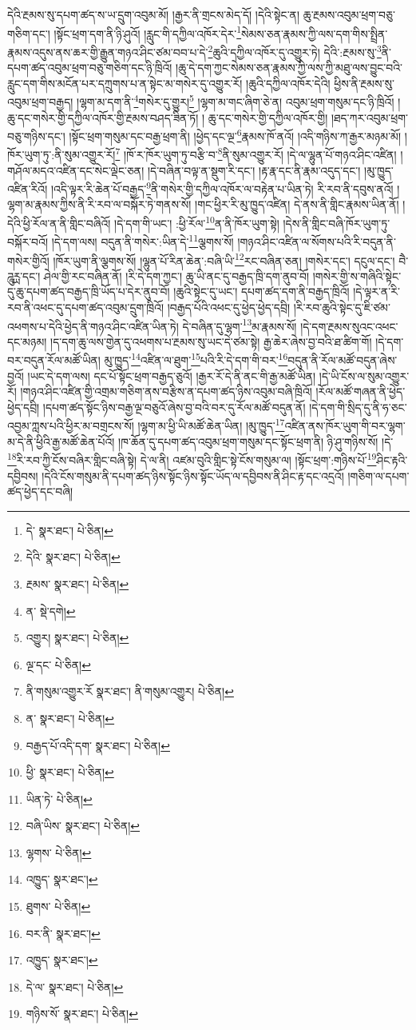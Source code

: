 དེའི་རྔམས་སུ་དཔག་ཚད་ས་ཡ་དྲུག་འབུམ་མོ། །རྒྱར་ནི་གྲངས་མེད་དོ། །དེའི་སྟེང་ན། ཆུ་རྔམས་འབུམ་ཕྲག་བཅུ་གཅིག་དང་། །སྟོང་ཕྲག་དག་ནི་ཉི་ཤུའོ། །རླུང་གི་དཀྱིལ་འཁོར་དེར་\footnote{དེ་  སྣར་ཐང་།  པེ་ཅིན། }སེམས་ཅན་རྣམས་ཀྱི་ལས་དག་གིས་སྤྲིན་རྣམས་འདུས་ནས་ཆར་གྱི་རྒྱུན་གཉའ་ཤིང་ཙམ་བབ་པ་དེ་\footnote{དེའི་  སྣར་ཐང་།  པེ་ཅིན། }ཆུའི་དཀྱིལ་འཁོར་དུ་འགྱུར་ཏེ། དེའི་:རྔམས་སུ་\footnote{རྔམས་  སྣར་ཐང་།  པེ་ཅིན། }ནི་དཔག་ཚད་འབུམ་ཕྲག་བཅུ་གཅིག་དང་ཉི་ཁྲིའོ། །ཆུ་དེ་དག་ཀྱང་སེམས་ཅན་རྣམས་ཀྱི་ལས་ཀྱི་མཐུ་ལས་བྱུང་བའི་རླུང་དག་གིས་མངོན་པར་དཀྲུགས་པ་ན་སྟེང་མ་གསེར་དུ་འགྱུར་རོ། །ཆུའི་དཀྱིལ་འཁོར་དེའི། ཕྱིས་ནི་རྔམས་སུ་འབུམ་ཕྲག་བརྒྱད། །ལྷག་མ་དག་ནི་\footnote{ན་  སྡེ་དགེ། }གསེར་དུ་གྱུར།\footnote{འགྱུར།  སྣར་ཐང་།  པེ་ཅིན། } །ལྷག་མ་གང་ཞིག་ཅེ་ན། འབུམ་ཕྲག་གསུམ་དང་ཉི་ཁྲིའོ། །ཆུ་དང་གསེར་གྱི་དཀྱིལ་འཁོར་གྱི་རྔམས་བཤད་ཟིན་ཏོ། །
ཆུ་དང་གསེར་གྱི་དཀྱིལ་འཁོར་གྱི། །ཐད་ཀར་འབུམ་ཕྲག་བཅུ་གཉིས་དང་། །སྟོང་ཕྲག་གསུམ་དང་བརྒྱ་ཕྲག་ནི། །ཕྱེད་དང་ལྔ་\footnote{ལྔ་དང་  པེ་ཅིན། }རྣམས་ཁོ་ནའོ། །འདི་གཉིས་ཀ་རྒྱར་མཉམ་མོ། །ཁོར་ཡུག་ཏུ་:ནི་སུམ་འགྱུར་རོ།\footnote{ནི་གསུམ་འགྱུར་རོ  སྣར་ཐང་། ནི་གསུམ་འགྱུར།  པེ་ཅིན། } །ཁོ་ར་ཁོར་ཡུག་ཏུ་བརྩི་བ་\footnote{ན་  སྣར་ཐང་།  པེ་ཅིན། }ནི་སུམ་འགྱུར་རོ། །དེ་ལ་ལྷུན་པོ་གཉའ་ཤིང་འཛིན། །གཤོལ་མདའ་འཛིན་དང་སེང་ལྡེང་ཅན། །དེ་བཞིན་བལྟ་ན་སྡུག་རི་དང་། །རྟ་རྣ་དང་ནི་རྣམ་འདུད་དང་། །མུ་ཁྱུད་འཛིན་རིའོ། །འདི་ལྟར་རི་ཆེན་པོ་བརྒྱད་\footnote{བརྒྱད་པོ་འདི་དག་  སྣར་ཐང་།  པེ་ཅིན། }ནི་གསེར་གྱི་དཀྱིལ་འཁོར་ལ་བརྟེན་པ་ཡིན་ཏེ། རི་རབ་ནི་དབུས་ནའོ། །ལྷག་མ་རྣམས་ཀྱིས་ནི་རི་རབ་ལ་བསྐོར་ཏེ་གནས་སོ། །གང་ཕྱིར་རི་མུ་ཁྱུད་འཛིན། དེ་ནས་ནི་གླིང་རྣམས་ཡིན་ནོ། །དེའི་ཕྱི་རོལ་ན་ནི་གླིང་བཞིའོ། །དེ་དག་གི་ཡང་། :ཕྱི་རོལ་\footnote{ཕྱི་  སྣར་ཐང་།  པེ་ཅིན། }ན་ནི་ཁོར་ཡུག་སྟེ། །དེས་ནི་གླིང་བཞི་ཁོར་ཡུག་ཏུ་བསྐོར་བའོ། །དེ་དག་ལས། བདུན་ནི་གསེར་:ཡིན་དེ་\footnote{ཡིན་ཏེ་  པེ་ཅིན། }ལྕགས་སོ། །གཉའ་ཤིང་འཛིན་ལ་སོགས་པའི་རི་བདུན་ནི་གསེར་གྱིའོ། །ཁོར་ཡུག་ནི་ལྕགས་སོ། །ལྷུན་པོ་རིན་ཆེན་:བཞི་ཡི་\footnote{བཞི་ཡིས་  སྣར་ཐང་།  པེ་ཅིན། }རང་བཞིན་ཅན། །གསེར་དང་། དངུལ་དང་། བཻ་ཌཱུཪྻ་དང་། ཤེལ་གྱི་རང་བཞིན་ནོ། །རི་དེ་དག་ཀྱང་། ཆུ་ཡི་ནང་དུ་བརྒྱད་ཁྲི་དག་ནུབ་བོ། །གསེར་གྱི་ས་གཞིའི་སྟེང་དུ་ཆུ་དཔག་ཚད་བརྒྱད་ཁྲི་ཡོད་པ་དེར་ནུབ་བོ། །ཆུའི་སྟེང་དུ་ཡང་། དཔག་ཚད་དག་ནི་བརྒྱད་ཁྲིའོ། །དེ་ལྟར་ན་རི་རབ་ནི་འཕང་དུ་དཔག་ཚད་འབུམ་དྲུག་ཁྲིའོ། །བརྒྱད་པོའི་འཕང་དུ་ཕྱེད་ཕྱེད་དབྲི། །རི་རབ་ཆུའི་སྟེང་དུ་ཇི་ཙམ་འཕགས་པ་དེའི་ཕྱེད་ནི་གཉའ་ཤིང་འཛིན་ཡིན་ཏེ། དེ་བཞིན་དུ་ལྷག་\footnote{ལྷགས་  པེ་ཅིན། }མ་རྣམས་སོ། །དེ་དག་རྔམས་སུའང་འཕང་དང་མཉམ། །ད་དག་ཆུ་ལས་གྱེན་དུ་འཕགས་པ་རྔམས་སུ་ཡང་དེ་ཙམ་སྟེ། རྒྱ་ཆེར་ཞེས་བྱ་བའི་ཐ་ཚིག་གོ། །དེ་དག་བར་བདུན་རོལ་མཚོ་ཡིན། མུ་ཁྱུད་\footnote{འཁྱུད་  སྣར་ཐང་། }འཛིན་ལ་ཐུག་\footnote{ཐུགས་  པེ་ཅིན། }པའི་རི་དེ་དག་གི་བར་\footnote{བར་ནི་  སྣར་ཐང་། }བདུན་ནི་རོལ་མཚོ་བདུན་ཞེས་བྱའོ། །ཡང་དེ་དག་ལས། དང་པོ་སྟོང་ཕྲག་བརྒྱད་ཅུའོ། །རྒྱར་རོ་དེ་ནི་ནང་གི་རྒྱ་མཚོ་ཡིན། །དེ་ཡི་ངོས་ལ་སུམ་འགྱུར་རོ། །གཉའ་ཤིང་འཛིན་གྱི་འགྲམ་གཅིག་ནས་བརྩིས་ན་དཔག་ཚད་ཉིས་འབུམ་བཞི་ཁྲིའོ། །རོལ་མཚོ་གཞན་ནི་ཕྱེད་ཕྱེད་དབྲི། །དཔག་ཚད་སྟོང་ཉིས་བརྒྱ་ལྔ་བཅུའོ་ཞེས་བྱ་བའི་བར་དུ་རོལ་མཚོ་བདུན་ནོ། །དེ་དག་གི་སྲིད་དུ་ནི་ཧ་ཅང་འབྱམ་ཀླས་པའི་ཕྱིར་མ་བགྲངས་སོ། །ལྷག་མ་ཕྱི་ཡི་མཚོ་ཆེན་ཡིན། །མུ་ཁྱུད་\footnote{འཁྱུད་  སྣར་ཐང་། }འཛིན་ནས་ཁོར་ཡུག་གི་བར་ལྷག་མ་དེ་ནི་ཕྱིའི་རྒྱ་མཚོ་ཆེན་པོའོ། །ཁ་ཆོན་དུ་དཔག་ཚད་འབུམ་ཕྲག་གསུམ་དང་སྟོང་ཕྲག་ནི། ཉི་ཤུ་གཉིས་སོ། །དེ་\footnote{དེ་ལ་  སྣར་ཐང་།  པེ་ཅིན། }རི་རབ་ཀྱི་ངོས་བཞིར་གླིང་བཞི་སྟེ། དེ་ལ་ནི། འཛམ་བུའི་གླིང་སྟེ་ངོས་གསུམ་ལ། །སྟོང་ཕྲག་:གཉིས་པོ་\footnote{གཉིས་སོ་  སྣར་ཐང་།  པེ་ཅིན། }ཤིང་རྟའི་དབྱིབས། །དེའི་ངོས་གསུམ་ནི་དཔག་ཚད་ཉིས་སྟོང་ཉིས་སྟོང་ཡོད་ལ་དབྱིབས་ནི་ཤིང་རྟ་དང་འདྲའོ། །གཅིག་ལ་དཔག་ཚད་ཕྱེད་དང་བཞི། 